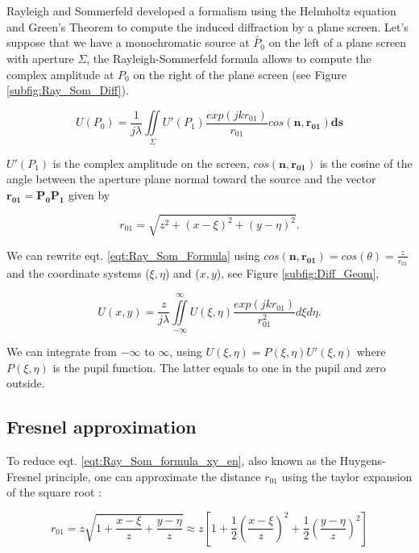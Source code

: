 Rayleigh and Sommerfeld developed a formalism using the Helmholtz equation and Green's Theorem to compute the induced diffraction by a plane screen. Let's suppose that we have a monochromatic source at $\widetilde{P_0}$ on the left of a plane screen with aperture $\Sigma$, the Rayleigh-Sommerfeld formula allows to compute the complex amplitude at $P_0$ on the right of the plane screen (see Figure \ref{subfig:Ray_Som_Diff}).

\begin{equation}
U(P_0) = \frac{1}{j\lambda} \iint\limits_{\Sigma} U'(P_1)\frac{exp(jkr_{01})}{r_{01}}cos(\mathbf{n},\mathbf{r_{01}})\mathbf{ds}
\label{eqt:Ray_Som_Formula}
\end{equation}

$U'(P_1)$ is the complex amplitude on the screen, $cos(\mathbf{n},\mathbf{r_{01}})$ is the cosine of the angle between the aperture plane normal toward the source and the vector $\mathbf{r_{01}} = \mathbf{P_0P_1}$ given by 

\begin{equation}
r_{01} = \sqrt{z^2 + (x-\xi)^2 + (y-\eta)^2}.
\label{eqt:r_01}
\end{equation}

We can rewrite eqt. \eqref{eqt:Ray_Som_Formula} using $cos(\mathbf{n},\mathbf{r_{01}}) = cos(\theta) = \frac{z}{r_{01}}$ and the coordinate systems ($\xi,\eta$) and ($x,y$), see Figure \ref{subfig:Diff_Geom},

\begin{equation}
U(x,y) = \frac{z}{j\lambda} \iint\limits_{-\infty}^{\infty} U(\xi,\eta)\frac{exp(jkr_{01})}{r_{01}^2} d\xi d\eta.
\label{eqt:Ray_Som_formula_xy_en}
\end{equation}

We can integrate from $-\infty$ to $\infty$, using $U(\xi,\eta) = P(\xi,\eta)U'(\xi,\eta)$ where $P(\xi,\eta)$ is the pupil function. The latter equals to one in the pupil and zero outside. 

\subsection{Fresnel approximation}
\label{subsec:FresnelApprox}

To reduce eqt. \eqref{eqt:Ray_Som_formula_xy_en}, also known as the Huygens-Fresnel principle, one can approximate the distance $r_{01}$ using the taylor expansion of the square root :

\begin{equation}
r_{01} = z \sqrt{1 + \frac{x-\xi}{z} + \frac{y-\eta}{z}} \approx z \left[1+\frac{1}{2}\left(\frac{x-\xi}{z}\right)^2+\frac{1}{2}\left(\frac{y-\eta}{z}\right)^2\right]
\label{eqt:approx_r01}
\end{equation}

